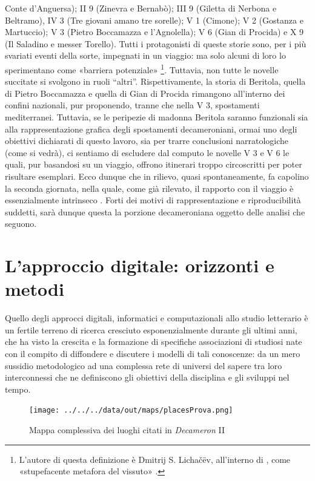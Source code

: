Conte d'Anguersa); II 9 (Zinevra e Bernabò); III 9 (Giletta di Nerbona e
Beltramo), IV 3 (Tre giovani amano tre sorelle); V 1 (Cimone); V 2
(Gostanza e Martuccio); V 3 (Pietro Boccamazza e l'Agnolella); V 6 (Gian
di Procida) e X 9 (Il Saladino e messer Torello). Tutti i protagonisti
di queste storie sono, per i più svariati eventi della sorte, impegnati
in un viaggio: ma solo alcuni di loro lo sperimentano come «barriera
potenziale» \footnote{L'autore di questa definizione è Dmitrij S.
  Lichačëv, all'interno di \autocite[pp.~26-39]{lotman1973}, come
  «stupefacente metafora del vissuto» \autocite[p.~550]{asor1992}.}.
Tuttavia, non tutte le novelle succitate si svolgono in ruoli ``altri''.
Rispettivamente, la storia di Beritola, quella di Pietro Boccamazza e
quella di Gian di Procida rimangono all'interno dei confini nazionali,
pur proponendo, tranne che nella V 3, spostamenti mediterranei.
Tuttavia, se le peripezie di madonna Beritola saranno funzionali sia
alla rappresentazione grafica degli spostamenti decameroniani, ormai uno
degli obiettivi dichiarati di questo lavoro, sia per trarre conclusioni
narratologiche (come si vedrà), ci sentiamo di escludere dal computo le
novelle V 3 e V 6 le quali, pur basandosi su un viaggio, offrono
itinerari troppo circoscritti per poter risultare esemplari. Ecco dunque
che in rilievo, quasi spontaneamente, fa capolino la seconda giornata,
nella quale, come già rilevato, il rapporto con il viaggio è
essenzialmente intrinseco \autocite{zatti2004}. Forti dei motivi di
rappresentazione e riproducibilità suddetti, sarà dunque questa la
porzione decameroniana oggetto delle analisi che seguono.

\section{L'approccio digitale: orizzonti e
metodi}\label{lapproccio-digitale-orizzonti-e-metodi}

Quello degli approcci digitali, informatici e computazionali allo studio
letterario è un fertile terreno di ricerca cresciuto esponenzialmente
durante gli ultimi anni, che ha visto la crescita e la formazione di
specifiche associazioni di studiosi nate con il compito di diffondere e
discutere i modelli di tali conoscenze: da un mero sussidio metodologico
ad una complessa rete di universi del sapere tra loro interconnessi che
ne definiscono gli obiettivi della disciplina e gli sviluppi nel tempo.

\begin{figure}
\centering
\texttt{[image: ../../../data/out/maps/placesProva.png]}
\caption{Mappa complessiva dei luoghi citati in \emph{Decameron}
II}\label{fig:totalPlaces}
\end{figure}

